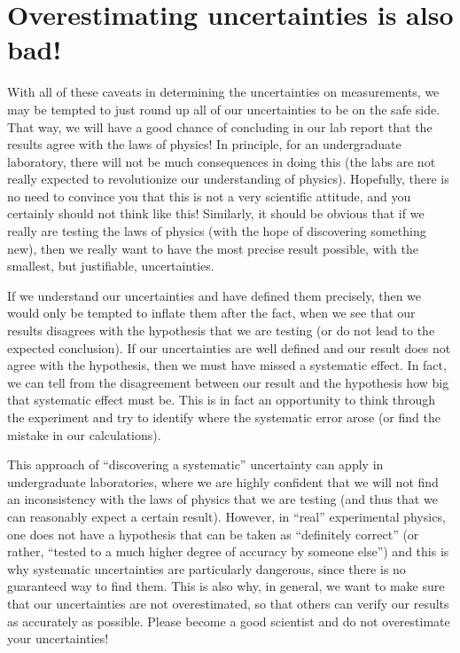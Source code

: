 \section{Overestimating uncertainties is also bad!}
With all of these caveats in determining the uncertainties on measurements, we may be tempted to just round up all of our uncertainties to be on the safe side. That way, we will have a good chance of concluding in our lab report that the results agree with the laws of physics! In principle, for an undergraduate laboratory, there will not be much consequences in doing this (the labs are not really expected to revolutionize our understanding of physics). Hopefully, there is no need to convince you that this is not a very scientific attitude, and you certainly should not think like this! Similarly, it should be obvious that if we really are testing the laws of physics (with the hope of discovering something new), then we really want to have the most precise result possible, with the smallest, but justifiable, uncertainties.

If we understand our uncertainties and have defined them precisely, then we would only be tempted to inflate them after the fact, when we see that our results disagrees with the hypothesis that we are testing (or do not lead to the expected conclusion). If our uncertainties are well defined and our result does not agree with the hypothesis, then we must have missed a systematic effect. In fact, we can tell from the disagreement between our result and the hypothesis how big that systematic effect must be. This is in fact an opportunity to think through the experiment and try to identify where the systematic error arose (or find the mistake in our calculations).

This approach of ``discovering a systematic'' uncertainty can apply in undergraduate laboratories, where we are highly confident that we will not find an inconsistency with the laws of physics that we are testing (and thus that we can reasonably expect a certain result). However, in ``real'' experimental physics, one does not have a hypothesis that can be taken as ``definitely correct'' (or rather, ``tested to a much higher degree of accuracy by someone else'') and this is why systematic uncertainties are particularly dangerous, since there is no guaranteed way to find them. This is also why, in general, we want to make sure that our uncertainties are not overestimated, so that others can verify our results as accurately as possible. Please become a good scientist and do not overestimate your uncertainties!


